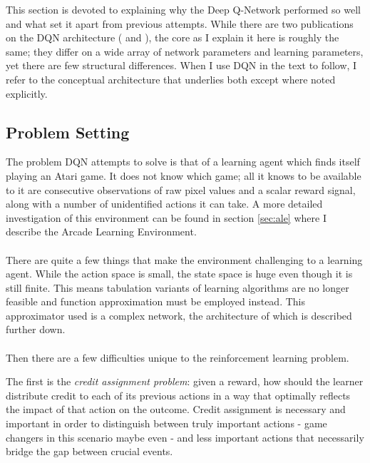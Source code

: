 This section is devoted to explaining why the Deep Q-Network
performed so well and what set it apart from previous attempts.
While there are two publications on the DQN architecture
(\citeyear{Mnih2013} and \citeyear{Mnih2015}),
the core as I explain it here is roughly the same;
they differ on a wide array of network parameters and learning parameters,
yet there are few structural differences.
When I use DQN in the text to follow,
I refer to the conceptual architecture that underlies both
except where noted explicitly.

\subsection{Problem Setting}
\label{sub:dqn_problem_setting}
The problem DQN attempts to solve
is that of a learning agent which finds itself playing an Atari game.
It does not know which game;
all it knows to be available to it
are consecutive observations of raw pixel values
and a scalar reward signal,
along with a number of unidentified actions it can take.
A more detailed investigation of this environment
can be found in section \ref{sec:ale}
where I describe the Arcade Learning Environment.

\paragraph{}
There are quite a few things that make the environment
challenging to a learning agent.
While the action space is small,
the state space is huge even though it is still finite.
This means tabulation variants of learning algorithms
are no longer feasible and function approximation must be employed instead.
This approximator used is a complex network,
the architecture of which is described further down.

\paragraph{}
Then there are a few difficulties
unique to the reinforcement learning problem.

The first is the \textit{credit assignment problem}:
given a reward,
how should the learner distribute credit to each of its previous actions
in a way that optimally reflects the impact of that action on the outcome.
Credit assignment is necessary and important
in order to distinguish between truly important actions
- game changers in this scenario maybe even -
and less important actions
that necessarily bridge the gap between crucial events.

